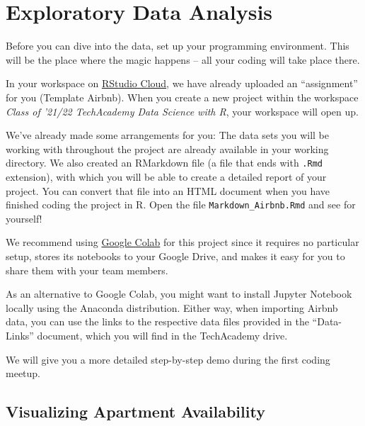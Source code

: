 \documentclass[
  11pt,
]{article}
\newenvironment{tips}[1]
  {
  \begin{itemize}
  \footnotesize
  \renewcommand{\labelitemi}{
    \raisebox{-.7\height}[0pt][0pt]{
      {\setkeys{Gin}{width=3em,keepaspectratio}
        \texttt{[image: images/\#1.png]}}
    }
  }
  \setlength{\fboxsep}{1em}
  \begin{rbox}
  \item
  }
  {
  \end{rbox}
  \end{itemize}
  }
\newenvironment{tipsp}[1]
  {
  \begin{itemize}
  \footnotesize
  \renewcommand{\labelitemi}{
    \raisebox{-.7\height}[0pt][0pt]{
      {\setkeys{Gin}{width=3em,keepaspectratio}
        \texttt{[image: images/\#1.png]}}
    }
  }
  \setlength{\fboxsep}{1em}
  \begin{pbox}
  \item
  }
  {
  \end{pbox}
  \end{itemize}
  }
\begin{document}
\newpage

\hypertarget{exploratory-data-analysis}{%
\section{Exploratory Data Analysis}\label{exploratory-data-analysis}}

Before you can dive into the data, set up your programming environment.
This will be the place where the magic happens -- all your coding will take place there.

\begin{tips}r
In your workspace on \href{https://rstudio.cloud/projects}{RStudio Cloud}, we have already uploaded an ``assignment'' for you (Template Airbnb).
When you create a new project within the workspace \emph{Class of '21/22 \textbar{} TechAcademy \textbar{} Data Science with R}, your workspace will open up.

We've already made some arrangements for you: The data sets you will be working with throughout the project are already available in your working directory.
We also created an RMarkdown file (a file that ends with \texttt{.Rmd} extension), with which you will be able to create a detailed report of your project.
You can convert that file into an HTML document when you have finished coding the project in R.
Open the file \texttt{Markdown\_Airbnb.Rmd} and see for yourself!

\end{tips}

\begin{tipsp}p
We recommend using \href{https://colab.research.google.com}{Google Colab} for this project since it requires no particular setup, stores its notebooks to your Google Drive, and makes it easy for you to share them with your team members.

As an alternative to Google Colab, you might want to install Jupyter Notebook locally using the Anaconda distribution.
Either way, when importing Airbnb data, you can use the links to the respective data files provided in the ``Data-Links'' document, which you will find in the TechAcademy drive.

We will give you a more detailed step-by-step demo during the first coding meetup.


\end{tipsp}

\hypertarget{visualizing-apartment-availability}{%
\subsection{Visualizing Apartment Availability}\label{visualizing-apartment-availability}}
\end{document}
